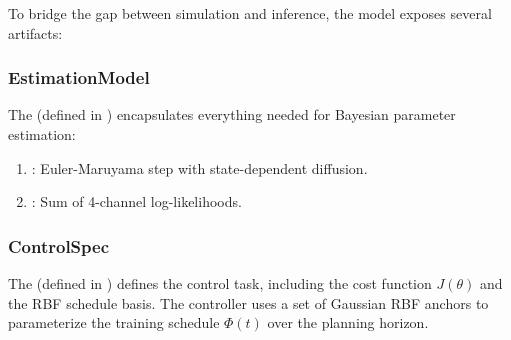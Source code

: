 To bridge the gap between simulation and inference, the model exposes several artifacts:

\subsubsection{EstimationModel}
The  (defined in ) encapsulates everything needed for Bayesian parameter estimation:
\begin{enumerate}
    \item {}: Euler-Maruyama step with state-dependent diffusion.
    \item {}: Sum of 4-channel log-likelihoods.
\end{enumerate}

\subsubsection{ControlSpec}
The  (defined in ) defines the control task, including the cost function \(J(\theta)\) and the RBF schedule basis.
The controller uses a set of Gaussian RBF anchors to parameterize the training schedule \(\Phi(t)\) over the planning horizon.
